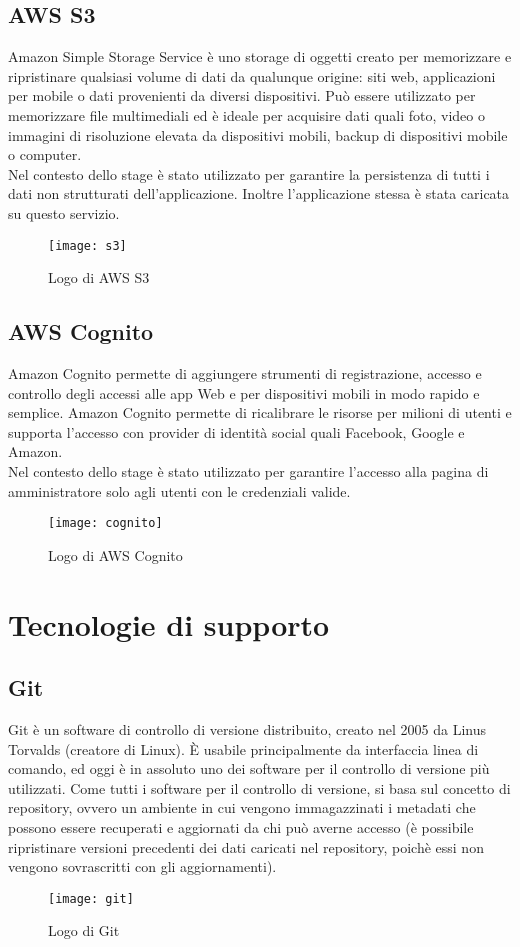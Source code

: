 \subsection{AWS S3} 
Amazon Simple Storage Service è uno storage di
oggetti creato per memorizzare e ripristinare qualsiasi volume di dati da qualunque
origine: siti web, applicazioni per mobile o dati provenienti da diversi dispositivi. Può
essere utilizzato per memorizzare file multimediali ed è ideale per acquisire dati quali
foto, video o immagini di risoluzione elevata da dispositivi mobili, backup di dispositivi
mobile o computer.
\\

Nel contesto dello stage è stato utilizzato per garantire la persistenza di tutti i dati
non strutturati dell’applicazione. Inoltre l'applicazione stessa è stata caricata su questo servizio.   
\begin{figure}[!h] 
	\centering 
	\texttt{[image: s3]}
	\caption{Logo di AWS S3}
\end{figure}

\subsection{AWS Cognito} 
Amazon Cognito permette di aggiungere strumenti di registrazione, accesso e controllo degli accessi alle app Web e per dispositivi mobili in modo rapido e semplice. Amazon Cognito permette di ricalibrare le risorse per milioni di utenti e supporta l'accesso con provider di identità social quali Facebook, Google e Amazon. 
\\

Nel contesto dello stage è stato utilizzato per garantire l'accesso alla pagina di amministratore solo agli utenti con le credenziali valide.   
\begin{figure}[!h] 
	\centering 
	\texttt{[image: cognito]}
	\caption{Logo di AWS Cognito}
\end{figure}\newpage
\section{Tecnologie di supporto}
\subsection{Git}
Git è un software di controllo di versione distribuito, creato nel 2005 da Linus
Torvalds (creatore di Linux). È usabile principalmente da interfaccia linea di comando,
ed oggi è in assoluto uno dei software per il controllo di versione più utilizzati. Come
tutti i software per il controllo di versione, si basa sul concetto di repository, ovvero
un ambiente in cui vengono immagazzinati i metadati che possono essere recuperati e
aggiornati da chi può averne accesso (è possibile ripristinare versioni precedenti dei
dati caricati nel repository, poichè essi non vengono sovrascritti con gli aggiornamenti).
\begin{figure}[!h] 
	\centering 
	\texttt{[image: git]}
	\caption{Logo di Git}
\end{figure}

